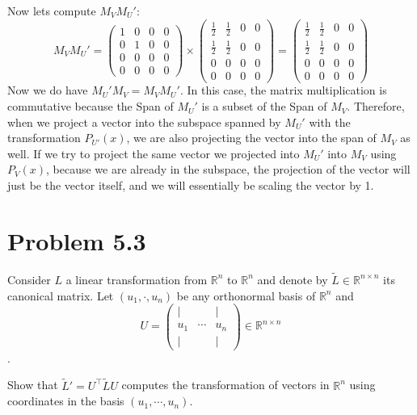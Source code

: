 \documentclass[12pt,twoside]{article}
\begin{document}
Now lets compute $M_V M_U'$:
$$
M_V M_U' = \begin{pmatrix}
    1 & 0 & 0 & 0\\
    0 & 1 & 0 & 0\\
    0 & 0 & 0 & 0\\
    0 & 0 & 0 & 0 
    \end{pmatrix} \times \begin{pmatrix}
    \frac{1}{2} &     \frac{1}{2} & 0 & 0 \\
        \frac{1}{2} &     \frac{1}{2} & 0 & 0 \\
        0 & 0 & 0 & 0 \\
        0 & 0 & 0 & 0
    \end{pmatrix} = 
    \begin{pmatrix}
    \frac{1}{2} &     \frac{1}{2} & 0 & 0 \\
        \frac{1}{2} &     \frac{1}{2} & 0 & 0 \\
        0 & 0 & 0 & 0 \\
        0 & 0 & 0 & 0
    \end{pmatrix}
$$
Now we do have $M_U' M_V = M_V M_U'$. In this case, the matrix multiplication is commutative because the Span of $M_U'$ is a subset of the Span of $M_V$. Therefore, when we project a vector into the subspace spanned by $M_U'$ with the transformation $P_{U'}(x)$, we are also projecting the vector into the span of $M_V$ as well. If we try to project the same vector we projected into $M_U'$ into $M_V$ using $P_V(x)$, because we are already in the subspace, the projection of the vector will just be the vector itself, and we will essentially be scaling the vector by 1.  

\section{Problem 5.3}
Consider $L$ a linear transformation from $\mathbb{R}^n$ to $\mathbb{R}^n$ and denote by $\tilde L \in \mathbb{R}^{n \times n}$ its canonical matrix. Let $(u_1, \cdot, u_n)$ be any orthonormal basis of $\mathbb{R}^n$ and 
    $$ U = \begin{pmatrix}
        | & & | \\
        u_1 & \cdots & u_n\\
        | & & |
    \end{pmatrix}\in \mathbb{R}^{n \times n}$$.

Show that $\tilde L ' = U^\top \tilde L U$ computes the transformation of vectors in $\mathbb{R}^n$ using coordinates in the basis $(u_1, \cdots, u_n)$.\\
\end{document}
